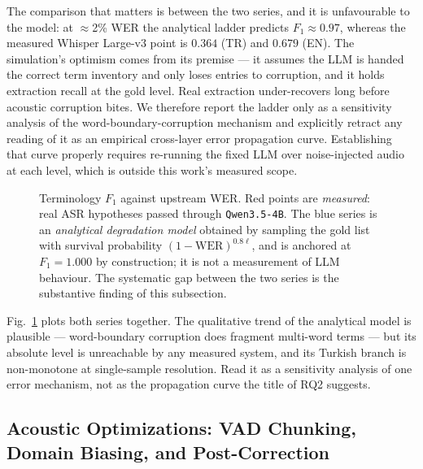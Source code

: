 \documentclass[conference]{IEEEtran}
\begin{document}
The comparison that matters is between the two series, and it is unfavourable to the model: at $\approx$2\% WER the analytical ladder predicts $F_1 \approx 0.97$, whereas the measured Whisper Large-v3 point is $0.364$ (TR) and $0.679$ (EN). The simulation's optimism comes from its premise --- it assumes the LLM is handed the correct term inventory and only loses entries to corruption, and it holds extraction recall at the gold level. Real extraction under-recovers long before acoustic corruption bites. We therefore report the ladder only as a sensitivity analysis of the word-boundary-corruption mechanism and explicitly retract any reading of it as an empirical cross-layer error propagation curve. Establishing that curve properly requires re-running the fixed LLM over noise-injected audio at each level, which is outside this work's measured scope.

\begin{figure}[t]
\centering

\caption{Terminology $F_1$ against upstream WER. Red points are \emph{measured}: real ASR hypotheses passed through \texttt{Qwen3.5-4B}. The blue series is an \emph{analytical degradation model} obtained by sampling the gold list with survival probability $(1-\mathrm{WER})^{0.8\ell}$, and is anchored at $F_1=1.000$ by construction; it is not a measurement of LLM behaviour. The systematic gap between the two series is the substantive finding of this subsection.}
\label{fig:cross_layer_curve}
\end{figure}



Fig.~\ref{fig:cross_layer_curve} plots both series together. The qualitative trend of the analytical model is plausible --- word-boundary corruption does fragment multi-word terms --- but its absolute level is unreachable by any measured system, and its Turkish branch is non-monotone at single-sample resolution. Read it as a sensitivity analysis of one error mechanism, not as the propagation curve the title of RQ2 suggests.

\subsection{Acoustic Optimizations: VAD Chunking, Domain Biasing, and Post-Correction}
\label{sec:acoustic-opt}
\end{document}
